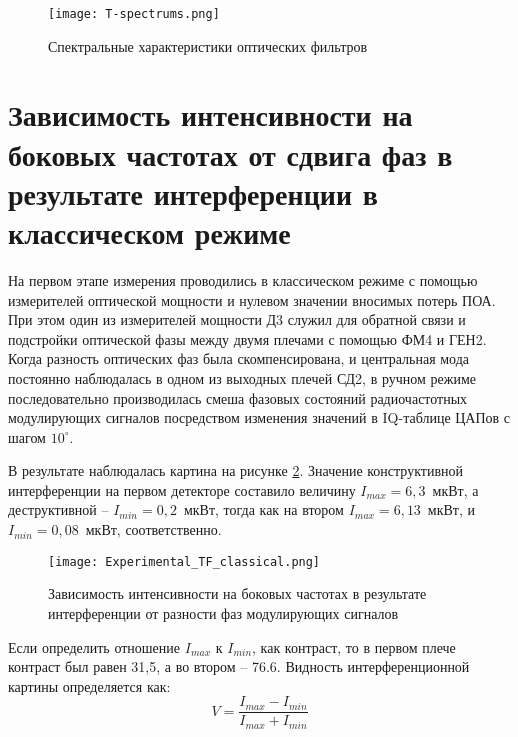  \begin{figure}[ht]
  \centering
  \texttt{[image: T-spectrums.png]}
  \caption{Спектральные характеристики оптических фильтров}
  \label{fig:Spectrums}
\end{figure}

\pagebreak




\section{Зависимость интенсивности на боковых частотах от сдвига фаз в результате интерференции в классическом режиме} \label{ch:ch5/sec5}


На первом этапе измерения проводились в классическом режиме с помощью измерителей оптической мощности и нулевом значении вносимых потерь ПОА. При этом один из измерителей мощности Д3 служил для обратной связи и подстройки оптической фазы между двумя плечами с помощью ФМ4 и ГЕН2. Когда разность оптических фаз была скомпенсирована, и центральная мода постоянно наблюдалась в одном из выходных плечей СД2, в ручном режиме последовательно производилась смеша фазовых состояний радиочастотных модулирующих сигналов посредством изменения значений в IQ-таблице ЦАПов с шагом $10^{\circ}$. 

В результате наблюдалась картина на рисунке \ref{fig:Experimental_TF_classical}. Значение конструктивной интерференции на первом детекторе составило величину $I_{max}=6,3$~мкВт, а деструктивной -- $I_{min}=0,2$~мкВт, тогда как на втором $I_{max}=6,13$~мкВт, и $I_{min}=0,08$~мкВт, соответственно. 

 \begin{figure}[ht]
  \centering
  \texttt{[image: Experimental\_TF\_classical.png]}
  \caption{Зависимость интенсивности на боковых частотах в результате интерференции от разности фаз модулирующих сигналов}
  \label{fig:Experimental_TF_classical}
\end{figure}

Если определить отношение $I_{max}$ к $I_{min}$, как контраст, то в первом плече контраст был равен 31,5, а во втором -- 76.6. Видность интерференционной картины определяется как: 
\begin{equation}
	V=\frac{I_{max}-I_{min}}{I_{max}+I_{min}}
\end{equation}


